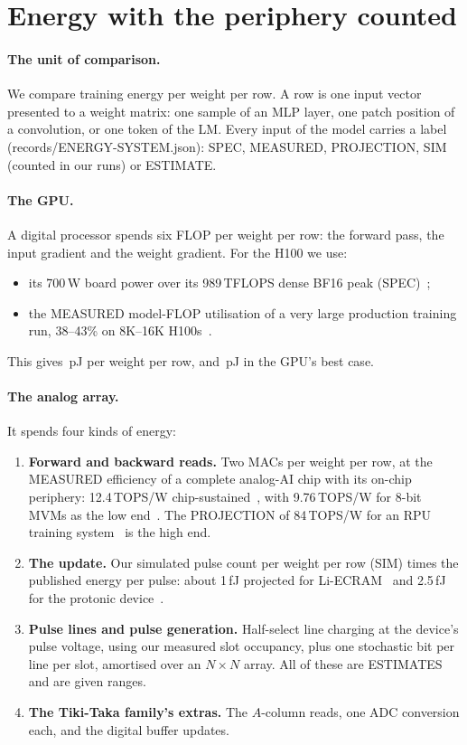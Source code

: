 \section{Energy with the periphery counted}\label{sec:energy}
\paragraph{The unit of comparison.} We compare training energy per weight per row. A row is one input vector presented to a
weight matrix: one sample of an MLP layer, one patch position of a convolution, or one token of the LM. Every input of the
model carries a label (records/ENERGY-SYSTEM.json): SPEC, MEASURED, PROJECTION, SIM (counted in our runs) or ESTIMATE.

\paragraph{The GPU.} A digital processor spends six FLOP per weight per row: the forward pass, the input gradient and the
weight gradient. For the H100 we use:
\begin{itemize}
\item its 700\,W board power over its 989\,TFLOPS dense BF16 peak (SPEC)~\cite{nvidiah100};
\item the MEASURED model-FLOP utilisation of a very large production training run, 38--43\% on 8K--16K H100s~\cite{dubey2024}.
\end{itemize}
This gives \REnGpuPj\,pJ per weight per row, and \REnGpuBestPj\,pJ in the GPU's best case.

\paragraph{The analog array.} It spends four kinds of energy:
\begin{enumerate}
\item \textbf{Forward and backward reads.} Two MACs per weight per row, at the MEASURED efficiency of a complete analog-AI chip
      with its on-chip periphery: 12.4\,TOPS/W chip-sustained~\cite{ambrogio2023}, with 9.76\,TOPS/W for 8-bit MVMs as the low
      end~\cite{legallo2023}. The PROJECTION of 84\,TOPS/W for an RPU training system~\cite{gokmen2016} is the high end.
\item \textbf{The update.} Our simulated pulse count per weight per row (SIM) times the published energy per pulse: about
      1\,fJ projected for Li-ECRAM~\cite{tang2018} and 2.5\,fJ for the protonic device~\cite{onen2022}.
\item \textbf{Pulse lines and pulse generation.} Half-select line charging at the device's pulse voltage, using our measured
      slot occupancy, plus one stochastic bit per line per slot, amortised over an $N\times N$ array. All of these are ESTIMATES
      and are given ranges.
\item \textbf{The Tiki-Taka family's extras.} The $A$-column reads, one ADC conversion each, and the digital buffer updates.
\end{enumerate}

